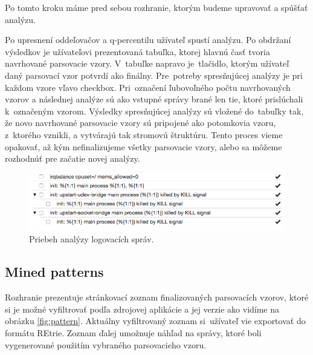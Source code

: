 Po tomto kroku máme pred sebou rozhranie, ktorým budeme upravovať a spúšťať analýzu.
\par Po upresnení oddeľovačov a q-percentilu užívateľ spustí analýzu. Po obdržaní výsledkov je užívateľovi prezentovaná tabuľka, ktorej hlavnú časť tvoria navrhované parsovacie vzory. V~tabuľke napravo je~tlačidlo, ktorým užívateľ daný parsovací vzor potvrdí ako finálny. Pre~potreby spresňujúcej analýzy je pri každom vzore vľavo checkbox. Pri~označení ľubovoľného počtu navrhovaných vzorov a následnej analýze sú ako vstupné správy brané len tie, ktoré prislúchali k~označeným vzorom. Výsledky spresňujúcej analýzy sú vložené do~tabuľky tak, že novo navrhované parsovacie vzory sú pripojené ako potomkovia vzoru, z~ktorého vznikli, a vytvárajú tak stromovú štruktúru. Tento proces vieme opakovať, až kým nefinalizujeme všetky parsovacie vzory, alebo sa môžeme rozhodnúť pre začatie novej analýzy.

\begin{figure}[htbp]
 \centering 
 \begin{minipage}{0.95\linewidth}
 	\centering
 	\includegraphics[width=\textwidth]{Images/thesis-miner-analysis.png}
 \end{minipage}
  \caption{Priebeh analýzy logovacích správ.}
  \label{fig:miner-source}
\end{figure}

\subsection{Mined patterns}
Rozhranie prezentuje stránkovací zoznam finalizovaných parsovacích vzorov, ktoré si je možné vyfiltrovať podľa zdrojovej aplikácie a jej verzie ako vidíme na obrázku \ref{fig:pattern}. Aktuálny vyfiltrovaný zoznam si~užívateľ vie exportovať do formátu REtrie. Zoznam ďalej umožnuje náhľad na správy, ktoré boli vygenerované použitím vybraného parsovacieho vzoru.

